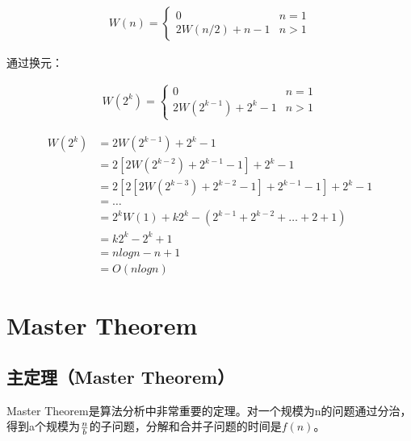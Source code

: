 \begin{align*}
	W(n) = \begin{cases}
		0               & n = 1 \\
		2W(n/2) + n - 1 & n > 1
	\end{cases}
\end{align*}

通过换元：

\vspace{-0.5cm}

\begin{align*}
	W(2^k) = \begin{cases}
		0                     & n = 1 \\
		2W(2^{k-1}) + 2^k - 1 & n > 1
	\end{cases}
\end{align*}

\vspace{-0.5cm}

\begin{align*}
	W(2^k) & = 2W(2^{k-1}) + 2^k - 1                                   \\
	       & = 2[2W(2^{k-2}) + 2^{k-1} - 1] + 2^k - 1                  \\
	       & = 2[2[2W(2^{k-3}) + 2^{k-2} - 1] + 2^{k-1} - 1] + 2^k - 1 \\
	       & = \dots                                                   \\
	       & = 2^k W(1) + k2^k - (2^{k-1} + 2^{k-2} + \dots + 2 + 1)   \\
	       & = k2^k - 2^k + 1                                          \\
	       & = nlogn - n + 1                                           \\
	       & = O(nlogn)
\end{align*}

\newpage

\section{Master Theorem}

\subsection{主定理（Master Theorem）}

Master Theorem是算法分析中非常重要的定理。对一个规模为n的问题通过分治，得到a个规模为$ n \over b $的子问题，分解和合并子问题的时间是$ f(n) $。

